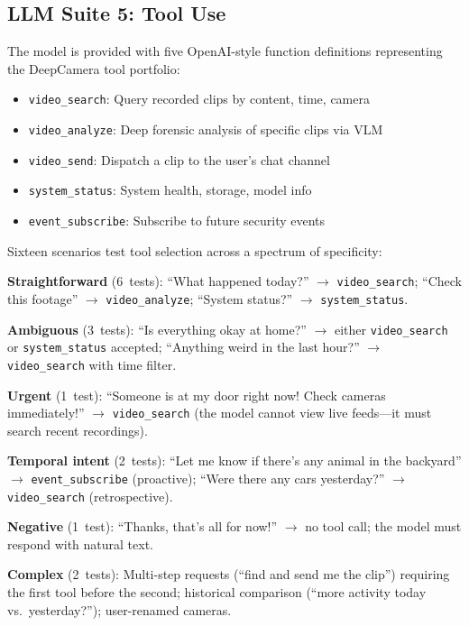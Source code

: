 \documentclass[onecolumn,10pt]{IEEEtran}
\begin{document}
\subsection{LLM Suite 5: Tool Use}

The model is provided with five OpenAI-style function definitions
representing the DeepCamera tool portfolio:

\begin{itemize}[nosep]
    \item \texttt{video\_search}: Query recorded clips by content, time,
    camera
    \item \texttt{video\_analyze}: Deep forensic analysis of specific
    clips via VLM
    \item \texttt{video\_send}: Dispatch a clip to the user's chat channel
    \item \texttt{system\_status}: System health, storage, model info
    \item \texttt{event\_subscribe}: Subscribe to future security events
\end{itemize}

Sixteen scenarios test tool selection across a spectrum of specificity:

\noindent\textbf{Straightforward} (6~tests): ``What happened today?''
$\rightarrow$ \texttt{video\_search}; ``Check this footage''
$\rightarrow$ \texttt{video\_analyze}; ``System status?''
$\rightarrow$ \texttt{system\_status}.

\noindent\textbf{Ambiguous} (3~tests): ``Is everything okay at home?''
$\rightarrow$ either \texttt{video\_search} or \texttt{system\_status}
accepted; ``Anything weird in the last hour?''
$\rightarrow$ \texttt{video\_search} with time filter.

\noindent\textbf{Urgent} (1~test): ``Someone is at my door right now!
Check cameras immediately!'' $\rightarrow$ \texttt{video\_search}
(the model cannot view live feeds---it must search recent recordings).

\noindent\textbf{Temporal intent} (2~tests): ``Let me know if there's
any animal in the backyard'' $\rightarrow$ \texttt{event\_subscribe}
(proactive); ``Were there any cars yesterday?'' $\rightarrow$
\texttt{video\_search} (retrospective).

\noindent\textbf{Negative} (1~test): ``Thanks, that's all for now!''
$\rightarrow$ no tool call; the model must respond with natural text.

\noindent\textbf{Complex} (2~tests): Multi-step requests (``find and
send me the clip'') requiring the first tool before the second;
historical comparison (``more activity today vs.\ yesterday?'');
user-renamed cameras.
\end{document}
